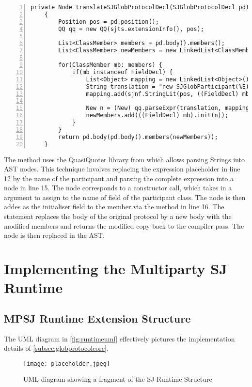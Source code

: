 \begin{lstlisting}[basicstyle=\LISTINGSTYLE, numbers=left]
	private Node translateSJGlobProtocolDecl(SJGlobProtocolDecl pd) throws SemanticException
	{		
		Position pos = pd.position();
		QQ qq = new QQ(sjts.extensionInfo(), pos);
		
		List<ClassMember> members = pd.body().members();
		List<ClassMember> newMembers = new LinkedList<ClassMember>();	
		
		for(ClassMember mb: members) {
			if(mb instanceof FieldDecl) {
				List<Object> mapping = new LinkedList<Object>();
				String translation = "new SJGlobParticipant(%E)";
				mapping.add(sjnf.StringLit(pos, ((FieldDecl) mb).name()));
			
				New n = (New) qq.parseExpr(translation, mapping);
				newMembers.add(((FieldDecl) mb).init(n));
			}
		}
		return pd.body(pd.body().members(newMembers));
	}
\end{lstlisting}

The method uses the QuasiQuoter library from  which allows parsing Strings into AST nodes. This technique involves replacing the expression placeholder  in line 12 by the name of the participant and parsing the complete expression into a  node in line 15. The  node corresponds to a  constructor call, which takes in a  argument to assign to the name of field of the participant class. The node is then addes as the initialiser field to the member via the method  in line 16. The  statement replaces the body of the original protocol by a new body with the modified members and returns the modified copy back to the compiler pass. The node is then replaced in the AST. 

\section{Implementing the Multiparty SJ Runtime}

\subsection{MPSJ Runtime Extension Structure}

The UML diagram in \autoref{fig:runtimeuml} effectively pictures the implementation details of \autoref{subsec:globprotocolcore}.  

\begin{figure}[htb]
\begin{center}
\texttt{[image: placeholder.jpeg]}
\caption{UML diagram showing a fragment of the SJ Runtime Structure}
\label{fig:runtimeuml}
\end{center}
\end{figure}

